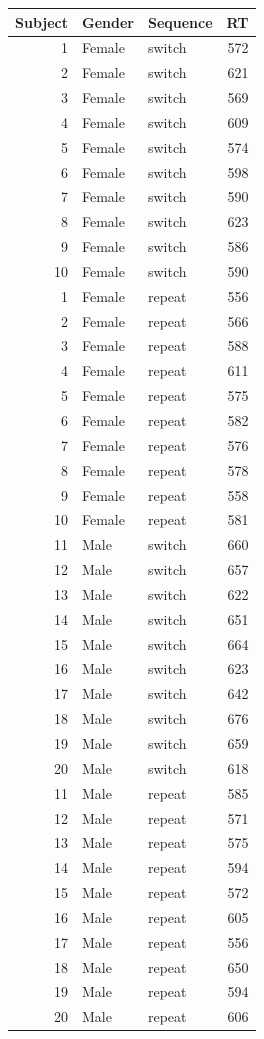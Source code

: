 \begin{tabular}{r|l|l|r}
\hline
Subject & Gender & Sequence & RT\\
\hline
1 & Female & switch & 572\\
\hline
2 & Female & switch & 621\\
\hline
3 & Female & switch & 569\\
\hline
4 & Female & switch & 609\\
\hline
5 & Female & switch & 574\\
\hline
6 & Female & switch & 598\\
\hline
7 & Female & switch & 590\\
\hline
8 & Female & switch & 623\\
\hline
9 & Female & switch & 586\\
\hline
10 & Female & switch & 590\\
\hline
1 & Female & repeat & 556\\
\hline
2 & Female & repeat & 566\\
\hline
3 & Female & repeat & 588\\
\hline
4 & Female & repeat & 611\\
\hline
5 & Female & repeat & 575\\
\hline
6 & Female & repeat & 582\\
\hline
7 & Female & repeat & 576\\
\hline
8 & Female & repeat & 578\\
\hline
9 & Female & repeat & 558\\
\hline
10 & Female & repeat & 581\\
\hline
11 & Male & switch & 660\\
\hline
12 & Male & switch & 657\\
\hline
13 & Male & switch & 622\\
\hline
14 & Male & switch & 651\\
\hline
15 & Male & switch & 664\\
\hline
16 & Male & switch & 623\\
\hline
17 & Male & switch & 642\\
\hline
18 & Male & switch & 676\\
\hline
19 & Male & switch & 659\\
\hline
20 & Male & switch & 618\\
\hline
11 & Male & repeat & 585\\
\hline
12 & Male & repeat & 571\\
\hline
13 & Male & repeat & 575\\
\hline
14 & Male & repeat & 594\\
\hline
15 & Male & repeat & 572\\
\hline
16 & Male & repeat & 605\\
\hline
17 & Male & repeat & 556\\
\hline
18 & Male & repeat & 650\\
\hline
19 & Male & repeat & 594\\
\hline
20 & Male & repeat & 606\\
\hline
\end{tabular}

